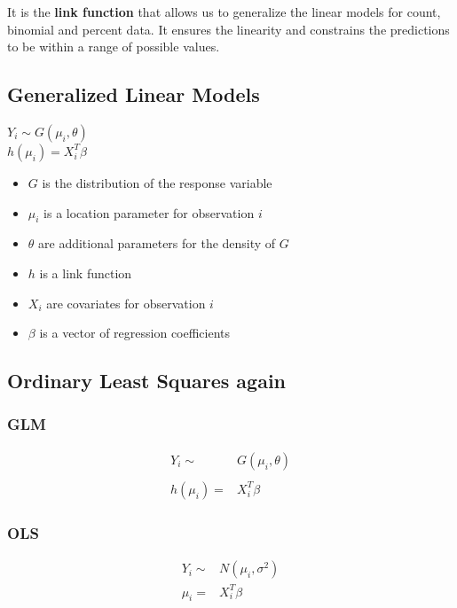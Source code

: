 \documentclass[
  openany]{book}
\providecommand{\tightlist}{%
  \setlength{\itemsep}{0pt}\setlength{\parskip}{0pt}}
\begin{document}
It is the \textbf{link function} that allows us to generalize the linear
models for count, binomial and percent data. It ensures the linearity
and constrains the predictions to be within a range of possible values.

\hypertarget{generalized-linear-models}{%
\subsection{Generalized Linear Models}\label{generalized-linear-models}}

\(Y_i \sim G(\mu_i, \theta)\)\\
\(h(\mu_i) = X_i^T\beta\)

\begin{itemize}
\tightlist
\item
  \(G\) is the distribution of the response variable
\item
  \(\mu_i\) is a location parameter for observation \(i\)
\item
  \(\theta\) are additional parameters for the density of \(G\)
\item
  \(h\) is a link function
\item
  \(X_i\) are covariates for observation \(i\)
\item
  \(\beta\) is a vector of regression coefficients
\end{itemize}

\hypertarget{ordinary-least-squares-again}{%
\subsection{Ordinary Least Squares again}\label{ordinary-least-squares-again}}

\hypertarget{glm}{%
\subsubsection{GLM}\label{glm}}

\begin{align*}
Y_i \sim & G (\mu_i, \theta)\\\\
h(\mu_i) = & X_i^T \beta
\end{align*}

\hypertarget{ols}{%
\subsubsection{OLS}\label{ols}}

\begin{align*}
Y_i \sim & N( \mu_i, \sigma^2)\\
\mu_i = & X^T_i \beta
\end{align*}
\end{document}
